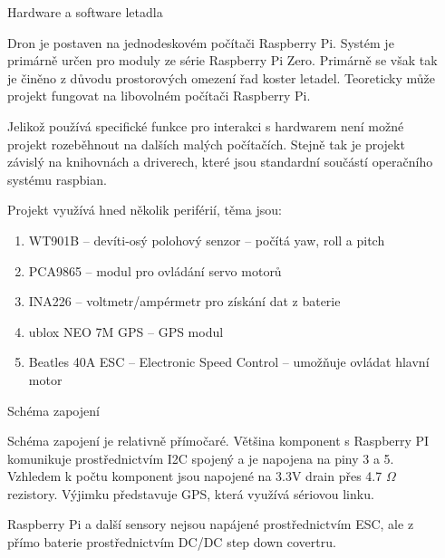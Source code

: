 \documentclass[final]{beamer}
\newlength{\sepwidth}
\newlength{\colwidth}
\newcommand{\separatorcolumn}{\begin{column}{\sepwidth}\end{column}}
\begin{document}
\begin{frame}[t]
\begin{columns}[t]
    \separatorcolumn

    \begin{column}{\colwidth}

      \begin{block}{Hardware a software letadla}

				Dron je postaven na jednodeskovém počítači Raspberry Pi.
				Systém je primárně určen pro moduly ze série Raspberry Pi Zero.
				Primárně se však tak je činěno z důvodu prostorových omezení řad koster letadel.
				Teoreticky může projekt fungovat na libovolném počítači Raspberry Pi.

				Jelikož používá specifické funkce pro interakci s hardwarem není možné projekt rozeběhnout na dalších malých počítačích.
				Stejně tak je projekt závislý na knihovnách a driverech, které jsou standardní součástí operačního systému raspbian.

				Projekt využívá hned několik periférií, těma jsou:

        \begin{enumerate}
          \item WT901B -- devíti-osý polohový senzor -- počítá yaw, roll a pitch
          \item PCA9865 -- modul pro ovládání servo motorů
          \item INA226 -- voltmetr/ampérmetr pro získání dat z baterie
					\item ublox NEO 7M GPS -- GPS modul
					\item Beatles 40A ESC -- Electronic Speed Control -- umožňuje ovládat hlavní motor
        \end{enumerate}

      \end{block}

      \begin{block}{Schéma zapojení}

				Schéma zapojení je relativně přímočaré.
				Většina komponent s Raspberry PI komunikuje prostřednictvím I2C spojený a je napojena na piny 3 a 5.
				Vzhledem k počtu komponent jsou napojené na 3.3V drain přes 4.7 $\Omega$ rezistory.
				Výjimku představuje GPS, která využívá sériovou linku.

				Raspberry Pi a další sensory nejsou napájené prostřednictvím ESC, ale z přímo baterie prostřednictvím DC/DC step down covertru.


\end{block}
\end{column}
\end{columns}
\end{frame}
\end{document}
